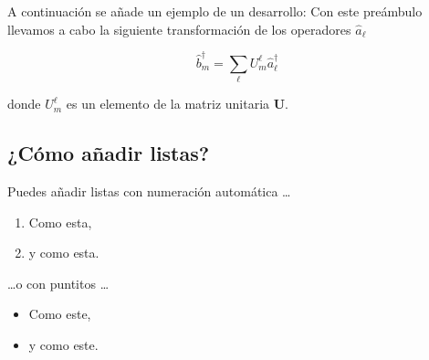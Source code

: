 \documentclass[12pt]{article}
\begin{document}
A continuación se añade un ejemplo de un desarrollo:
Con este preámbulo llevamos a cabo la siguiente transformación de los operadores $\hat{a}_{\ell}$

\begin{equation}
\hat{b}_{m}^{\dagger}=\sum_{\ell}U_{m}^{\ell}\hat{a}_{\ell}^{\dagger}
\end{equation}

donde $U_{m}^{\ell}$ es un elemento de la matriz unitaria $\mathbf{U}$.



\subsection{¿Cómo añadir listas?}

Puedes añadir listas con numeración automática \dots

\begin{enumerate}
\item Como esta,
\item y como esta.
\end{enumerate}
\dots o con puntitos \dots
\begin{itemize}
\item Como este,
\item y como este.
\end{itemize}
\end{document}
